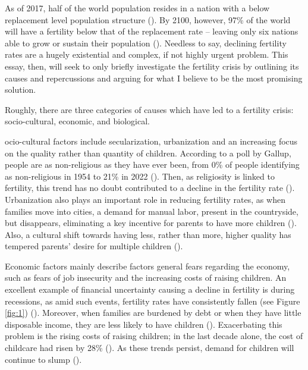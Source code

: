 \documentclass[12pt, a4paper, twoside]{article}
\begin{document}
\maketitle{}

As of 2017, half of the world population resides in a nation with a below replacement level population structure (\cite{frejka2017half}). By 2100, however, 97\% of the world will have a fertility below that of the replacement rate – leaving only six nations able to grow or sustain their population (\cite{thelancet2024dramatic}). Needless to say, declining fertility rates are a hugely existential and complex, if not highly urgent problem. This essay, then, will seek to only briefly investigate the fertility crisis by outlining its causes and repercussions and arguing for what I believe to be the most promising solution. 

Roughly, there are three categories of causes which have led to a fertility crisis: socio-cultural, economic, and biological.  

ocio-cultural factors include secularization, urbanization and an increasing focus on the quality rather than quantity of children. According to a poll by Gallup, people are as non-religious as they have ever been, from 0\% of people identifying as non-religious in 1954 to 21\% in 2022 (\cite{newport2022slowdown}). Then, as religiosity is linked to fertility, this trend has no doubt contributed to a decline in the fertility rate (\cite[p.\ 85]{kearney2023causes}). Urbanization also plays an important role in reducing fertility rates, as when families move into cities, a demand for manual labor, present in the countryside, but  disappears, eliminating a key incentive for parents to have more children (\cite{bricker2021birthrates}). Also, a cultural shift towards having less, rather than more, higher quality has tempered parents’ desire for multiple children (\cite[p.\ 84]{kearney2023causes}).  

Economic factors mainly describe factors general fears regarding the economy, such as fears of job insecurity and the increasing costs of raising children. An excellent example of financial uncertainty causing a decline in fertility is during recessions, as amid such events, fertility rates have consistently fallen (see Figure \ref{fig:1}) (\cite[p.\ 83]{kearney2023causes}). Moreover, when families are burdened by debt or when they have little disposable income, they are less likely to have children (\cite[pp.\ 82, 84]{kearney2023causes}). Exacerbating this problem is the rising costs of raising children; in the last decade alone, the cost of childcare had risen by 28\% (\cite{usafacts2022childcare}). As these trends persist, demand for children will continue to slump (\cites{becker1960economic}{lino2017cost}). 
\end{document}
